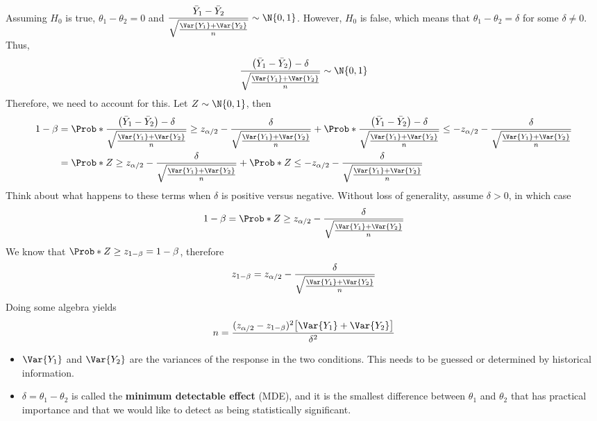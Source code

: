 Assuming $ H_0 $ is true, $ \theta_1-\theta_2=0 $ and $ \displaystyle \frac{\bar{Y}_1-\bar{Y}_2}{\sqrt{\frac{\Var{Y_1}+\Var{Y_2}}{n}}} \sim \N{0,1} $.
However, $ H_0 $ is false, which means that $ \theta_1-\theta_2=\delta $ for some $ \delta\ne 0 $. Thus,
\[ \frac{\bigl(\bar{Y}_1-\bar{Y}_2\bigr)-\delta}{\sqrt{\frac{\Var{Y_1}+\Var{Y_2}}{n}}}\sim \N{0,1}  \]
Therefore, we need to account for this. Let $ Z \sim \N{0,1} $, then
\begin{align*}
      1-\beta
       & =\Prob*{\frac{\bigl(\bar{Y}_1-\bar{Y}_2\bigr)-\delta}{\sqrt{\frac{\Var{Y_1}+\Var{Y_2}}{n}}}\ge z_{\alpha/2}-\frac{\delta}{\sqrt{\frac{\Var{Y_1}+\Var{Y_2}}{n}}}}+\Prob*{\frac{\bigl(\bar{Y}_1-\bar{Y}_2\bigr)-\delta}{\sqrt{\frac{\Var{Y_1}+\Var{Y_2}}{n}}}\le -z_{\alpha/2}-\frac{\delta}{\sqrt{\frac{\Var{Y_1}+\Var{Y_2}}{n}}}} \\
       & =\Prob*{Z\ge z_{\alpha/2}-\frac{\delta}{\sqrt{\frac{\Var{Y_1}+\Var{Y_2}}{n}}}}+\Prob*{Z\le -z_{\alpha/2}-\frac{\delta}{\sqrt{\frac{\Var{Y_1}+\Var{Y_2}}{n}}}}
\end{align*}
Think about what happens to these terms when $ \delta $ is positive versus negative.
Without loss of generality, assume $ \delta>0 $, in which case
\[ 1-\beta=\Prob*{Z\ge z_{\alpha/2}-\frac{\delta}{\sqrt{\frac{\Var{Y_1}+\Var{Y_2}}{n}}}} \]
We know that $ \Prob*{Z\ge z_{1-\beta}}=1-\beta $, therefore
\[ z_{1-\beta}=z_{\alpha/2}-\frac{\delta}{\sqrt{\frac{\Var{Y_1}+\Var{Y_2}}{n}}} \]
Doing some algebra yields
\[ n=\frac{(z_{\alpha/2}-z_{1-\beta})^2\bigl[\Var{Y_1}+\Var{Y_2}\bigr]}{\delta^2}  \]
\begin{itemize}
      \item $ \Var{Y_1} $ and $ \Var{Y_2} $ are the variances of the response in the two conditions.
            This needs to be guessed or determined by historical information.
      \item $ \delta=\theta_1-\theta_2 $ is called the \textbf{minimum detectable effect} (MDE), and it
            is the smallest difference between $ \theta_1 $ and $ \theta_2 $ that has practical importance
            and that we would like to detect as being statistically significant.
\end{itemize}
